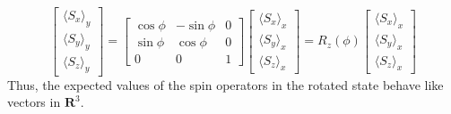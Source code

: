 \documentclass{article}
\numberwithin{equation}{section}
\newcommand{\qev}[1]{\langle #1 \rangle} %
\theoremstyle{plain}
\numberwithin{thm}{section}
\theoremstyle{plain}
\numberwithin{prop}{section}
\theoremstyle{definition}
\numberwithin{defn}{section}
\theoremstyle{remark}
\begin{document}
\begin{equation}\label{s4e19}
\begin{bmatrix}\qev{S_x}_y \\ \qev{S_y}_y \\ \qev{S_z}_y\end{bmatrix}
= \begin{bmatrix}\cos\phi & -\sin\phi & 0 \\
\sin\phi & \cos\phi & 0 \\
0 & 0 & 1\end{bmatrix}
\begin{bmatrix}\qev{S_x}_x \\ \qev{S_y}_x \\ \qev{S_z}_x\end{bmatrix} =
R_z(\phi)\begin{bmatrix}\qev{S_x}_x \\ \qev{S_y}_x \\ \qev{S_z}_x\end{bmatrix}
\end{equation}
Thus, the expected values of the spin operators in the rotated state behave 
like vectors in $\mathbf{R}^3$.
\end{document}
